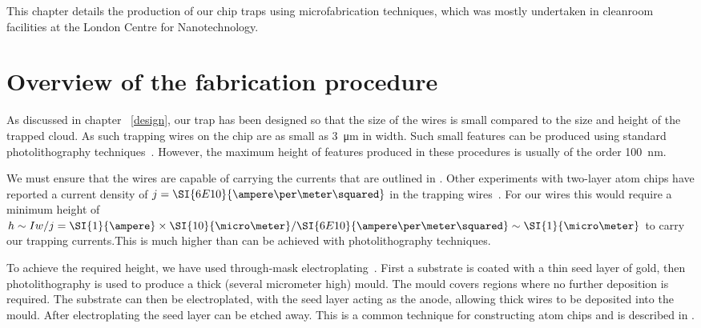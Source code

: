 This chapter details the production of our chip traps using microfabrication
techniques, which was mostly undertaken in cleanroom facilities at the London
Centre for Nanotechnology.

\section{Overview of the fabrication procedure}

As discussed in chapter ~\ref{design}, our trap has been designed so that the size of the wires is small compared to
the size and height of the trapped cloud. As such trapping wires on the chip
are as small as \SI{3}{\micro\meter} in width. Such small features can be
produced using standard photolithography techniques~\cite{Madou2002}. However,
the maximum height of features produced in these procedures is usually of the
order \SI{100}{\nano\meter}.

We must ensure that the wires are capable of carrying the currents that are
outlined in . Other experiments with two-layer
atom chips have reported a current density of
$j=\SI{6E10}{\ampere\per\meter\squared}$ in the trapping
wires~\cite{Treutlein2008}. For our wires this would require a minimum height
of $h \sim I w/j = \SI{1}{\ampere} \times
\SI{10}{\micro\meter}/\SI{6E10}{\ampere\per\meter\squared} \sim
\SI{1}{\micro\meter}$  to carry our trapping currents.This is much higher than
can be achieved with photolithography techniques.

To achieve the required height, we have used through-mask
electroplating~\cite{Ruythooren_2000}. First a substrate is coated with a thin
seed layer of gold, then photolithography is used to produce a thick (several
micrometer high) mould. The mould covers regions where no further deposition is
required. The substrate can then be electroplated, with the seed layer acting
as the anode, allowing thick wires to be deposited into the mould.
After electroplating the seed layer can be etched away. This is a common
technique for constructing atom chips and is described in .

